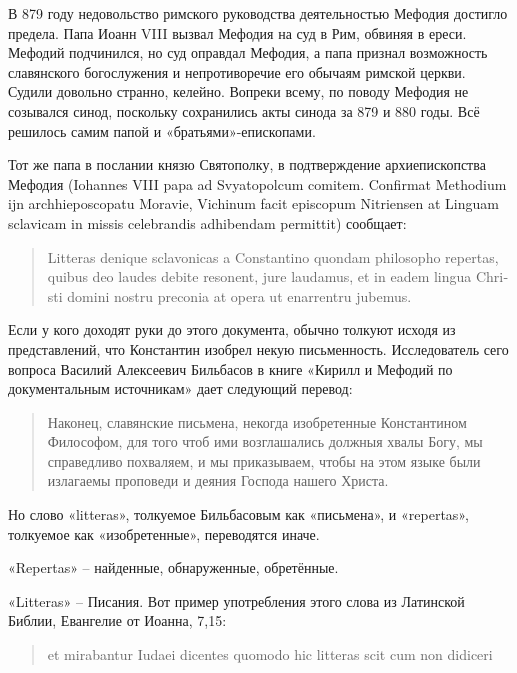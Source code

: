 \documentclass[a5paper,11pt,openany]{article}
\begin{document}
В 879 году недовольство римского руководства деятельностью Мефодия достигло предела. Папа Иоанн VIII вызвал Мефодия на суд в Рим, обвиняя в ереси. Мефодий подчинился, но суд оправдал Мефодия, а папа признал возможность славянского богослужения и непротиворечие его обычаям римской церкви. Судили довольно странно, келейно. Вопреки всему, по поводу Мефодия не созывался синод, поскольку сохранились акты синода за 879 и 880 годы. Всё решилось самим папой и «братьями»-епископами.

Тот же папа в послании князю Святополку, в подтверждение архиепископства Мефодия (Iohannes VIII papa ad Svyatopolcum comitem. Confirmat Methodium ijn archhieposcopatu Moravie, Vichinum facit episcopum Nitriensen at Linguam sclavicam in missis celebrandis adhi\-bendam permittit) сообщает:

\begin{quotation}
\begin{otherlanguage}{latin}
Litteras denique sclavonicas a Constantino quondam philosopho repertas, quibus deo laudes debite resonent, jure laudamus, et in eadem lingua Christi domini nostru preconia at opera ut enarren\-tru jubemus.
\end{otherlanguage}
\end{quotation}

Если у кого доходят руки до этого документа, обычно толкуют исходя из представлений, что Константин изобрел некую письменность. Исследователь сего вопроса Василий Алексеевич Бильбасов в книге «Кирилл и Мефодий по документальным источникам»\cite{bilbasov} дает следующий перевод:

\begin{quotation}
Наконец, славянские письмена, некогда изобретенные Константином Философом, для того чтоб ими возглашались должныя хвалы Богу, мы справедливо похваляем, и мы приказываем, чтобы на этом языке были излагаемы проповеди и деяния Господа нашего Христа.
\end{quotation}

Но слово «litteras», толкуемое Бильбасовым как «письмена», и «repertas», толкуемое как «изобретенные», переводятся иначе.

«Repertas» – найденные, обнаруженные, обретённые.

«Litteras» – Писания. Вот пример употребления этого слова из Латинской Библии, Евангелие от Иоанна, 7,15:

\begin{quotation}
\begin{otherlanguage}{latin}
et mirabantur Iudaei dicentes quomodo hic litteras scit cum non didiceri  
\end{otherlanguage}
\end{quotation}
\end{document}
